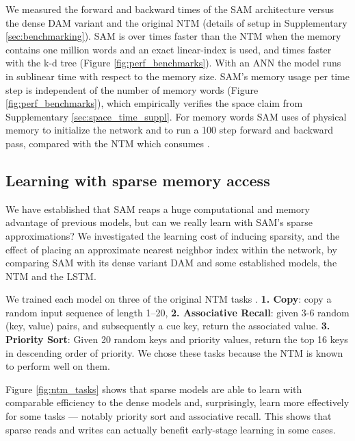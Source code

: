 \documentclass{article}
\begin{document}
We measured the forward and backward times of the SAM architecture versus the dense DAM variant and the original NTM (details of setup in Supplementary \ref{sec:benchmarking}). SAM is over  times faster than the NTM when the memory contains one million words and an exact linear-index is used, and  times faster with the k-d tree (Figure \ref{fig:perf_benchmarks}). With an ANN the model runs in sublinear time with respect to the memory size. SAM's memory usage per time step is independent of the number of memory words (Figure \ref{fig:perf_benchmarks}), which empirically verifies the  space claim from Supplementary \ref{sec:space_time_suppl}. For  memory words SAM uses  of physical memory to initialize the network and  to run a 100 step forward and backward pass, compared with the NTM which consumes .

















\subsection{Learning with sparse memory access}

\label{ss:ntm_tasks}

We have established that SAM reaps a huge computational and memory advantage of previous models, but can we really learn with SAM's sparse approximations? We investigated the learning cost of inducing sparsity, and the effect of placing an approximate nearest neighbor index within the network, by comparing SAM with its dense variant DAM and some established models, the NTM and the LSTM.

We trained each model on three of the original NTM tasks \cite{graves2014neural}. \textbf{1. Copy}: copy a random input sequence of length 1--20, \textbf{2. Associative Recall}: given 3-6 random (key, value) pairs, and subsequently a cue key, return the associated value. \textbf{3. Priority Sort}: Given 20 random keys and priority values, return the top 16 keys in descending order of priority. We chose these tasks because the NTM is known to perform well on them.





Figure \ref{fig:ntm_tasks} shows that sparse models are able to learn with comparable efficiency to the dense models and, surprisingly, learn more effectively for some tasks --- notably priority sort and associative recall. This shows that sparse reads and writes can actually benefit early-stage learning in some cases.
\end{document}
